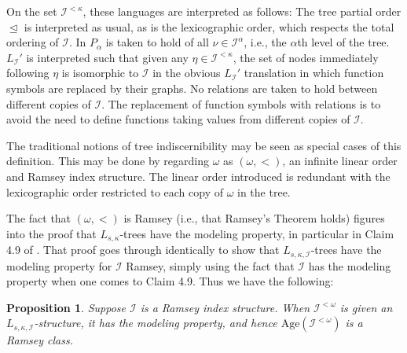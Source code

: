 \documentclass{article}
\newcommand{\calI}{\mathcal{I}}
\newtheorem{proposition}{Proposition}
\theoremstyle{definition}
\theoremstyle{definition}
\theoremstyle{definition}
\theoremstyle{definition}
\begin{document}
On the set $\calI^{<\kappa}$, these languages are interpreted as follows: The tree partial order $\trianglelefteq$ is interpreted as usual, as is the lexicographic order, which respects the total ordering of $\calI$. In $P_{\alpha}$ is taken to hold of all $\nu\in \calI^{\alpha}$, i.e., the $\alpha$th level of the tree. $L_\calI'$ is interpreted such that given any $\eta\in\calI^{<\kappa}$, the set of nodes immediately following $\eta$ is isomorphic to $\calI$ in the obvious $L_\calI'$ translation in which function symbols are replaced by their graphs. No relations are taken to hold between different copies of $\calI$. The replacement of function symbols with relations is to avoid the need to define functions taking values from different copies of $\calI$.

The traditional notions of tree indiscernibility may be seen as special cases of this definition. This may be done by regarding $\omega$ as $(\omega,<)$, an infinite linear order and Ramsey index structure. The linear order introduced is redundant with the lexicographic order restricted to each copy of $\omega$ in the tree.

The fact that $(\omega, <)$ is Ramsey (i.e., that Ramsey's Theorem holds) figures into the proof that $L_{s,\kappa}$-trees have the modeling property, in particular in Claim 4.9 of \cite{Kim_Kim_Scow_2013}. That proof goes through identically to show that $L_{s,\kappa,\calI}$-trees have the modeling property for $\calI$ Ramsey, simply using the fact that $\calI$ has the modeling property when one comes to Claim 4.9. Thus we have the following:


\begin{proposition}{}\label{L_s,I trees have modeling property}
    Suppose $\calI$ is a Ramsey index structure. When $\calI^{<\omega}$ is given an $L_{s,\kappa,\calI}$-structure, it has the modeling property, and hence $\text{Age}(\calI^{<\omega})$ is a Ramsey class.

\end{proposition}

\end{document}
